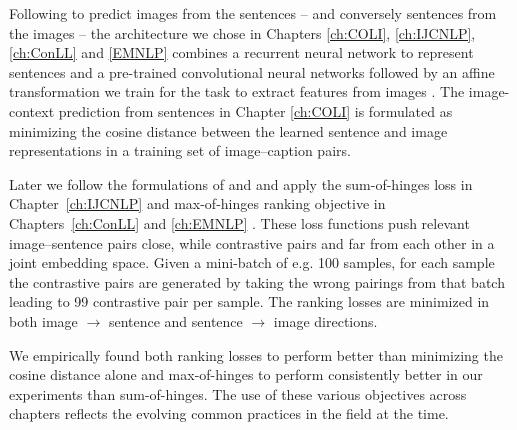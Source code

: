 Following \cite{kiros2014unifying} to predict images from the sentences
-- and conversely sentences from the images --
the architecture we chose in
Chapters \ref{ch:COLI}, \ref{ch:IJCNLP}, \ref{ch:ConLL} and \ref{EMNLP}  combines
a recurrent neural network to
represent sentences and a pre-trained convolutional neural networks
followed by an affine transformation we train for the task
to extract features from images .
The image-context prediction from sentences in
Chapter \ref{ch:COLI} is formulated  as minimizing the cosine distance
between the learned sentence  and image representations
in a training set of image--caption pairs.


Later we follow the formulations of \cite{vendrov2015order} and \cite{faghri2017vse++} and apply
the sum-of-hinges loss in Chapter~\ref{ch:IJCNLP} and max-of-hinges ranking objective
in Chapters~\ref{ch:ConLL} and \ref{ch:EMNLP} . These loss functions
push relevant image--sentence pairs close, while contrastive pairs  and
far from each other in a joint embedding space. Given a mini-batch of e.g. 100 samples, for each sample
the contrastive pairs are generated by taking the wrong pairings from that batch leading to
99 contrastive pair per sample. The ranking losses are minimized in both image $\rightarrow$ sentence
and sentence $\rightarrow$ image directions.

We empirically found both ranking losses to perform better than minimizing the cosine distance alone 
and max-of-hinges to perform consistently better in our experiments than sum-of-hinges. 
The use of these various objectives across
chapters  reflects the evolving common practices in the field at the time.



